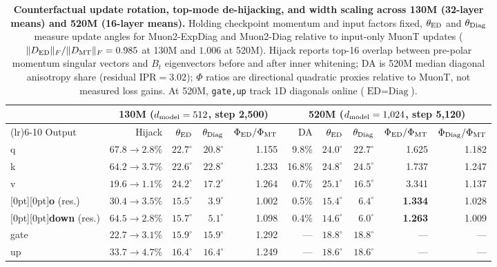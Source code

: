\begin{table}[!htb]\centering\small
\setlength{\tabcolsep}{4.4pt}
\caption{\textbf{Counterfactual update rotation, top-mode de-hijacking, and width scaling across 130M (32-layer means) and 520M (16-layer means).} Holding checkpoint momentum and input factors fixed, $\theta_{\rm ED}$ and $\theta_{\rm Diag}$ measure update angles for Muon2-ExpDiag and Muon2-Diag relative to input-only MuonT updates ($\|D_{\rm ED}\|_F/\|D_{\rm MT}\|_F = 0.985$ at 130M and $1.006$ at 520M). Hijack reports top-16 overlap between pre-polar momentum singular vectors and $B_t$ eigenvectors before and after inner whitening; DA is 520M median diagonal anisotropy share (residual $\mathrm{IPR}=3.02$); $\Phi$ ratios are directional quadratic proxies relative to MuonT, not measured loss gains. At 520M, \texttt{gate,up} track 1D diagonals online ($\text{ED}=\text{Diag}$).}\label{tab:mechanism_rotation}
\begin{tabularx}{\textwidth}{@{}>{\raggedright\arraybackslash}Xrrrrrrrrr@{}}
\toprule
& \multicolumn{4}{c}{130M ($d_{\mathrm{model}}=512$, step 2,500)} & \multicolumn{5}{c}{520M ($d_{\mathrm{model}}=1{,}024$, step 5,120)} \\
\cmidrule(lr){2-5}\cmidrule(lr){6-10}
Output & Hijack & $\theta_{\rm ED}$ & $\theta_{\rm Diag}$ & $\Phi_{\rm ED}/\Phi_{\rm MT}$ & DA & $\theta_{\rm ED}$ & $\theta_{\rm Diag}$ & $\Phi_{\rm ED}/\Phi_{\rm MT}$ & $\Phi_{\rm Diag}/\Phi_{\rm MT}$ \\
\midrule
q & $67.8\to2.8\%$ & $22.7^\circ$ & $20.8^\circ$ & 1.155 & 9.8\% & $24.0^\circ$ & $22.7^\circ$ & 1.625 & 1.182 \\
k & $64.2\to3.7\%$ & $22.6^\circ$ & $22.8^\circ$ & 1.233 & 16.8\% & $24.8^\circ$ & $24.5^\circ$ & 1.737 & 1.247 \\
v & $19.6\to1.1\%$ & $24.2^\circ$ & $17.2^\circ$ & 1.264 & 0.7\% & $25.1^\circ$ & $16.5^\circ$ & 3.341 & 1.137 \\
\addlinespace[2.5pt]
\rowcolor{rowtint}[0pt][0pt]\textbf{o} (res.) & $30.4\to3.5\%$ & $15.5^\circ$ & $3.9^\circ$ & 1.002 & 0.5\% & $\mathbf{15.4^\circ}$ & $6.4^\circ$ & \textbf{1.334} & 1.028 \\
\rowcolor{rowtint}[0pt][0pt]\textbf{down} (res.) & $64.5\to2.8\%$ & $15.7^\circ$ & $5.1^\circ$ & 1.098 & 0.4\% & $\mathbf{14.6^\circ}$ & $6.0^\circ$ & \textbf{1.263} & 1.009 \\
\addlinespace[2.5pt]
gate & $22.7\to3.1\%$ & $15.9^\circ$ & $15.9^\circ$ & 1.292 & --- & $18.8^\circ$ & $18.8^\circ$ & --- & --- \\
up & $33.7\to4.7\%$ & $16.4^\circ$ & $16.4^\circ$ & 1.249 & --- & $18.6^\circ$ & $18.6^\circ$ & --- & --- \\
\bottomrule\end{tabularx}
\end{table}
